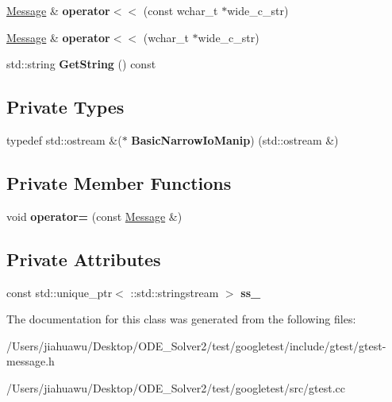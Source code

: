 \begin{DoxyCompactItemize}
\mbox{\hyperlink{classtesting_1_1_message}{Message}} \& {\bfseries operator$<$$<$} (const wchar\+\_\+t $\ast$wide\+\_\+c\+\_\+str)
\item 
\mbox{\label{classtesting_1_1_message_ac1d3a041ac4bb9c929ee746b31a13d6a}} 
\mbox{\hyperlink{classtesting_1_1_message}{Message}} \& {\bfseries operator$<$$<$} (wchar\+\_\+t $\ast$wide\+\_\+c\+\_\+str)
\item 
\mbox{\label{classtesting_1_1_message_a2cdc4df62bdcc9df37651a1cf527704e}} 
std\+::string {\bfseries Get\+String} () const
\end{DoxyCompactItemize}
\subsection*{Private Types}
\begin{DoxyCompactItemize}
\item 
\mbox{\label{classtesting_1_1_message_ad398b70e2a11b923cef05c809b0eeb92}} 
typedef std\+::ostream \&($\ast$ {\bfseries Basic\+Narrow\+Io\+Manip}) (std\+::ostream \&)
\end{DoxyCompactItemize}
\subsection*{Private Member Functions}
\begin{DoxyCompactItemize}
\item 
\mbox{\label{classtesting_1_1_message_a5a0462b539ffb88f15ea0c67977774af}} 
void {\bfseries operator=} (const \mbox{\hyperlink{classtesting_1_1_message}{Message}} \&)
\end{DoxyCompactItemize}
\subsection*{Private Attributes}
\begin{DoxyCompactItemize}
\item 
\mbox{\label{classtesting_1_1_message_a22a52314ba644b1eda454a82ac1fabd8}} 
const std\+::unique\+\_\+ptr$<$ \+::std\+::stringstream $>$ {\bfseries ss\+\_\+}
\end{DoxyCompactItemize}


The documentation for this class was generated from the following files\+:\begin{DoxyCompactItemize}
\item 
/\+Users/jiahuawu/\+Desktop/\+O\+D\+E\+\_\+\+Solver2/test/googletest/include/gtest/gtest-\/message.\+h\item 
/\+Users/jiahuawu/\+Desktop/\+O\+D\+E\+\_\+\+Solver2/test/googletest/src/gtest.\+cc\end{DoxyCompactItemize}
